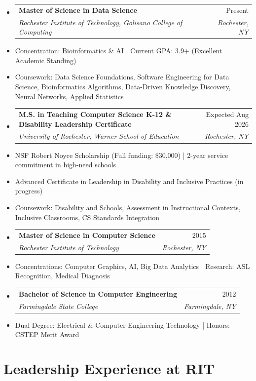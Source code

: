 \documentclass[10pt]{article}
\makeatletter
\newcommand{\resumeItem}[1]{\item\small{#1}}
\newcommand{\resumeSubheading}[4]{
  \vspace{-1pt}\item
    \begin{tabular*}{0.97\textwidth}[t]{l@{\extracolsep{\fill}}r}
      \textbf{#1} & #2 \\
      \textit{\small#3} & \textit{\small #4} \\
    \end{tabular*}\vspace{-5pt}
}
\makeatother
\begin{document}
\begin{itemize}[leftmargin=*]
\resumeSubheading
{Master of Science in Data Science}{Present}
{Rochester Institute of Technology, Golisano College of Computing}{Rochester, NY}
\resumeItem{Concentration: Bioinformatics \& AI | Current GPA: 3.9+ (Excellent Academic Standing)}
\resumeItem{Coursework: Data Science Foundations, Software Engineering for Data Science, Bioinformatics Algorithms, Data-Driven Knowledge Discovery, Neural Networks, Applied Statistics}

\resumeSubheading
{M.S. in Teaching Computer Science K-12 \& Disability Leadership Certificate}{Expected Aug 2026}
{University of Rochester, Warner School of Education}{Rochester, NY}
\resumeItem{NSF Robert Noyce Scholarship (Full funding: \$30,000) | 2-year service commitment in high-need schools}
\resumeItem{Advanced Certificate in Leadership in Disability and Inclusive Practices (in progress)}
\resumeItem{Coursework: Disability and Schools, Assessment in Instructional Contexts, Inclusive Classrooms, CS Standards Integration}

\resumeSubheading
{Master of Science in Computer Science}{2015}
{Rochester Institute of Technology}{Rochester, NY}
\resumeItem{Concentrations: Computer Graphics, AI, Big Data Analytics | Research: ASL Recognition, Medical Diagnosis}

\resumeSubheading
{Bachelor of Science in Computer Engineering}{2012}
{Farmingdale State College}{Farmingdale, NY}
\resumeItem{Dual Degree: Electrical \& Computer Engineering Technology | Honors: CSTEP Merit Award}
\end{itemize}


\section{Leadership Experience at RIT}
\end{document}
